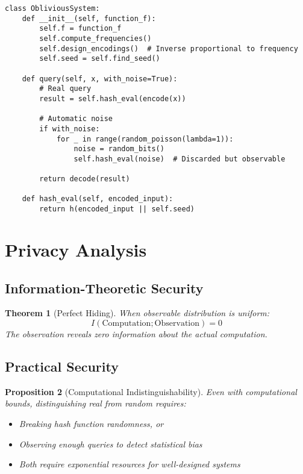 \documentclass[11pt,final,hidelinks]{article}
\newtheorem{theorem}{Theorem}[section]
\newtheorem{proposition}[theorem]{Proposition}
\begin{document}
\begin{verbatim}
class ObliviousSystem:
    def __init__(self, function_f):
        self.f = function_f
        self.compute_frequencies()
        self.design_encodings()  # Inverse proportional to frequency
        self.seed = self.find_seed()
        
    def query(self, x, with_noise=True):
        # Real query
        result = self.hash_eval(encode(x))
        
        # Automatic noise
        if with_noise:
            for _ in range(random_poisson(lambda=1)):
                noise = random_bits()
                self.hash_eval(noise)  # Discarded but observable
                
        return decode(result)
        
    def hash_eval(self, encoded_input):
        return h(encoded_input || self.seed)
\end{verbatim}

\section{Privacy Analysis}

\subsection{Information-Theoretic Security}

\begin{theorem}[Perfect Hiding]
When observable distribution is uniform:
\begin{equation}
I(\text{Computation}; \text{Observation}) = 0
\end{equation}
The observation reveals zero information about the actual computation.
\end{theorem}

\subsection{Practical Security}

\begin{proposition}[Computational Indistinguishability]
Even with computational bounds, distinguishing real from random requires:
\begin{itemize}
    \item Breaking hash function randomness, or
    \item Observing enough queries to detect statistical bias
    \item Both require exponential resources for well-designed systems
\end{itemize}
\end{proposition}
\end{document}
